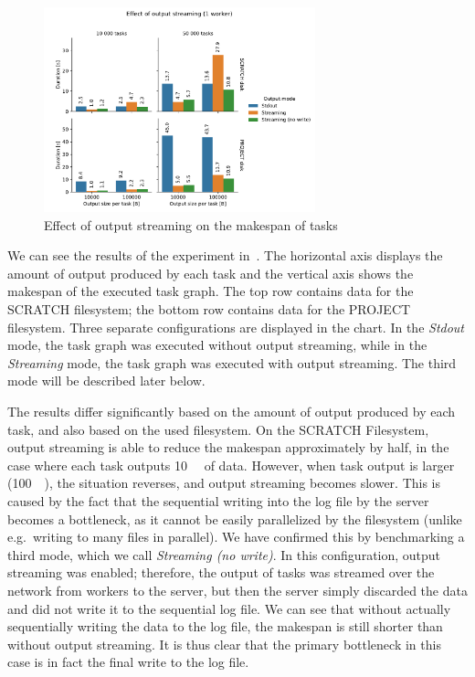 \begin{figure}[h]
	\centering
	\includegraphics[width=0.7\textwidth]{imgs/hq/charts/io-streaming}
	\caption{Effect of output streaming on the makespan of tasks}
	\label{fig:hq-io-streaming}
\end{figure}

We can see the results of the experiment in~. The horizontal axis displays
the amount of output produced by each task and the vertical axis shows the makespan of the executed
task graph. The top row contains data for the SCRATCH filesystem; the bottom row contains data for
the PROJECT filesystem. Three separate configurations are displayed in the chart. In the
\emph{Stdout} mode, the task graph was executed without output streaming, while in the
\emph{Streaming} mode, the task graph was executed with output streaming. The third mode
will be described later below.

The results differ significantly based on the amount of output produced by each task, and also
based on the used filesystem. On the SCRATCH Filesystem, output streaming is able to reduce the
makespan approximately by half, in the case where each task outputs \SI{10}{\kibi\byte} of
data. However, when task output is larger (\SI{100}{\kibi\byte}), the situation reverses, and
output streaming becomes slower. This is caused by the fact that the sequential writing into the
log file by the server becomes a bottleneck, as it cannot be easily parallelized by the filesystem
(unlike e.g.\ writing to many files in parallel). We have confirmed this by benchmarking a third
mode, which we call \emph{Streaming (no write)}. In this configuration, output streaming was enabled;
therefore, the output of tasks was streamed over the network from workers to the server, but then
the server simply discarded the data and did not write it to the sequential log file. We can see
that without actually sequentially writing the data to the log file, the makespan is still shorter
than without output streaming. It is thus clear that the primary bottleneck in this case is in fact
the final write to the log file.

